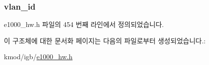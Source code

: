 \subsubsection[{\texorpdfstring{vlan\+\_\+id}{vlan_id}}]{ vlan\+\_\+id}\hypertarget{structe1000__host__mng__dhcp__cookie_a4d0bbf63fb5b0662f44a2ccfa1f3d6fe}{}\label{structe1000__host__mng__dhcp__cookie_a4d0bbf63fb5b0662f44a2ccfa1f3d6fe}


e1000\+\_\+hw.\+h 파일의 454 번째 라인에서 정의되었습니다.



이 구조체에 대한 문서화 페이지는 다음의 파일로부터 생성되었습니다.\+:\begin{DoxyCompactItemize}
\item 
kmod/igb/\hyperlink{kmod_2igb_2e1000__hw_8h}{e1000\+\_\+hw.\+h}\end{DoxyCompactItemize}
